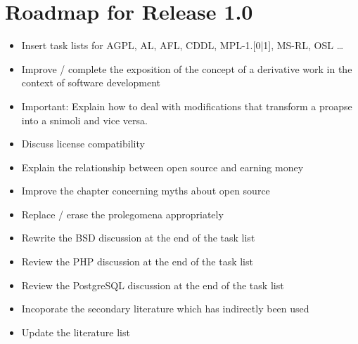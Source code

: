 %
%
%
%


\chapter*{Roadmap for Release 1.0} 

\begin{footnotesize}
\begin{itemize}
  \item Insert task lists for AGPL, AL, AFL, CDDL, MPL-1.[0|1], MS-RL, OSL
  \ldots
  \item Improve / complete the exposition of the concept of a derivative work
    in the context of software development
  \item Important: Explain how to deal with modifications that transform
    a proapse into a snimoli and vice versa.
  \item Discuss license compatibility
  \item Explain the relationship between open source and earning money

  \item Improve the chapter concerning myths about open source

  \item Replace / erase the prolegomena appropriately
  \item Rewrite the BSD discussion at the end of the task list 

  \item Review the PHP discussion at the end of the task list
  \item Review the PostgreSQL discussion at the end of the task list

  \item Incoporate the secondary literature which has indirectly been used
  \item Update the literature list
\end{itemize}
\end{footnotesize}

%

